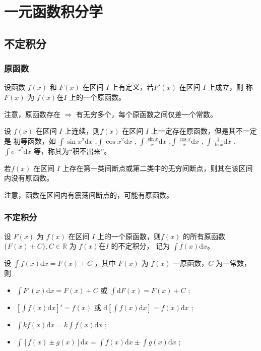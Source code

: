 \chapter{一元函数积分学}

\section{不定积分}

\subsection{原函数}

\begin{Def}[原函数]

    设函数 $ f(x) $ 和 $ F(x) $ 在区间 $ I $ 上有定义，若$ F'(x) $ 在区间 $ I $ 上成立，则
    称 $ F(x) $ 为 $ f(x) $在$ I $ 上的一个原函数。
\end{Def}

注意，原函数存在 $ \Rightarrow $ 有无穷多个，每个原函数之间仅差一个常数。

设 $ f(x) $ 在区间 $ I $ 上连续，则$ f(x) $ 在区间 $ I $ 上一定存在原函数，但是其不一定是
初等函数，如 $ \int \sin x^2 \mathrm{d}x $ ,$ \int \cos x^2 \mathrm{d}x $ ,
$ \int \frac{\sin x}{x} \mathrm{d}x $ ,$ \int \frac{\cos x}{x} \mathrm{d}x $ ,
$ \int \frac{1}{\ln x} \mathrm{d}x $ , $ \int e^{-x^2} \mathrm{d}x $ 等，称其为“积不出来”。

若$ f(x) $ 在区间 $ I $ 上存在第一类间断点或第二类中的无穷间断点，则其在该区间内没有原函数。

注意，函数在区间内有震荡间断点的，可能有原函数。

\subsection{不定积分}

\begin{Def}[不定积分]

    设 $ F(x) $ 为 $ f(x) $ 在区间 $ I $ 上的一个原函数，则$ f(x) $ 
    的所有原函数 $ \{F(x)+C\},C\in \mathbb{R} $ 为 $ f(x) $在$ I $ 的不定积分，
    记为 $ \int f(x) \mathrm{d}x$。
\end{Def}

\begin{Field}[不定积分基本性质]

    设 $ \int f(x)\mathrm{d}x = F(x)+C $ ，其中 $ F(x) $ 为 $ f(x) $ 一原函数，$ C $ 为一常数，
    则\begin{itemize}
        \item $ \int F'(x)\mathrm{d}x=F(x)+C $ 或 $ \int \mathrm{d}F(x)=F(x)+C $ ;
        \item $ [\int f(x)\mathrm{d}x]'=f(x) $ 或 $ \mathrm{d}[\int f(x)\mathrm{d}x]=f(x)\mathrm{d}x $ ;
        \item $ \int kf(x)\mathrm{d}x = k\int f(x)\mathrm{d}x $ ;
        \item $ \int [f(x)\pm g(x)]\mathrm{d}x = \int f(x)\mathrm{d}x \pm \int g(x)\mathrm{d}x $ ;
    \end{itemize}
\end{Field}

